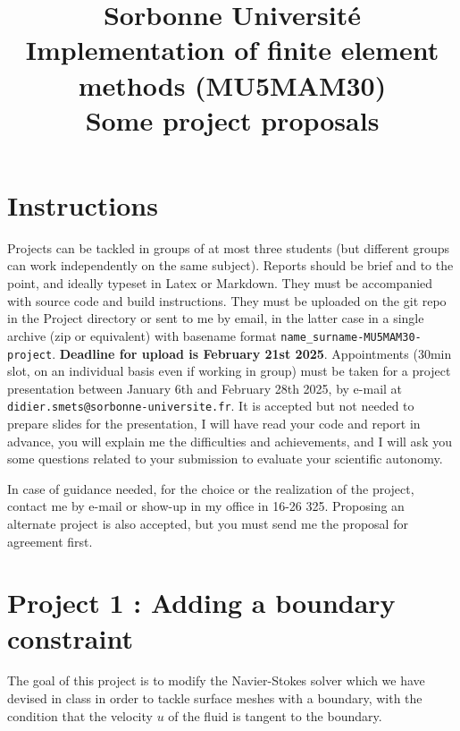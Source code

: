 \documentclass[11pt]{article}
\title{\bf 
	Sorbonne Université\\
	Implementation of finite element methods (MU5MAM30)\\[1cm]
	Some project proposals
}
\author{}
\date{}
\begin{document}
\maketitle

\section*{Instructions}

Projects can be tackled in groups of at most three students (but different groups
can work independently on the same subject). Reports should be brief and to the
point, and ideally typeset in Latex or Markdown. They must be accompanied with source
code and build instructions. They must be uploaded on the git repo in the
Project directory or sent to me by email, in the latter case in a single archive 
(zip or equivalent) with basename format 
\texttt{name\_surname-MU5MAM30-project}. {\bf Deadline for upload is
February 21st 2025}. Appointments (30min slot, on an individual basis even if working in 
group) must be taken for a project presentation between January 6th and 
February 28th 2025, by e-mail at {\tt didier.smets@sorbonne-universite.fr}.
It is accepted but not needed to prepare slides for the presentation, I will 
have read your code and report in advance,  you will explain me the difficulties 
and achievements, and I will ask you some questions related to your submission 
to evaluate your scientific autonomy.    


\medskip
In case of guidance needed, for the choice or the realization of the project, 
contact me by e-mail or show-up in my office in 16-26 325. Proposing an
alternate project is also accepted, but you must send me the proposal for
agreement first.

\pagebreak

\section*{Project 1 : Adding a boundary constraint}
The goal of this project is to modify the Navier-Stokes solver
which we have devised in class in order to tackle surface meshes 
with a boundary, with the condition that the velocity $u$ of the fluid
is tangent to the boundary.
\end{document}
